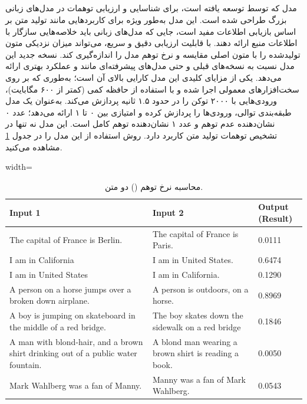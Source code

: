 \documentclass[11pt, a4paper, oneside]{book}
\begin{document}
			\subsection{}
				مدل  که توسط  توسعه یافته است، برای شناسایی و ارزیابی توهمات در مدل‌های زبانی بزرگ طراحی شده است. این مدل به‌طور ویژه برای کاربردهایی مانند تولید متن بر اساس بازیابی اطلاعات مفید است، جایی که مدل‌های زبانی باید خلاصه‌هایی سازگار با اطلاعات منبع ارائه دهند.  با قابلیت ارزیابی دقیق و سریع، می‌تواند میزان نزدیکی متون تولیدشده را با متون اصلی مقایسه و نرخ توهم مدل را اندازه‌گیری کند. نسخه جدید این مدل نسبت به نسخه‌های قبلی و حتی مدل‌های پیشرفته‌ای مانند  و  عملکرد بهتری ارائه می‌دهد. یکی از مزایای کلیدی این مدل کارایی بالای آن است؛ به‌طوری که بر روی سخت‌افزارهای معمولی اجرا شده و با استفاده از حافظه کمی (کمتر از ۶۰۰ مگابایت)، ورودی‌هایی با ۲۰۰۰ توکن را در حدود ۱.۵ ثانیه پردازش می‌کند.  به‌عنوان یک مدل طبقه‌بندی توالی، ورودی‌ها را پردازش کرده و امتیازی بین ۰ تا ۱ ارائه می‌دهد؛ عدد ۰ نشان‌دهنده عدم توهم و عدد ۱ نشان‌دهنده توهم کامل است. این مدل نه تنها در تشخیص توهمات تولید متن کاربرد دارد. روش استفاده از این مدل را در جدول \ref{Hallucination} مشاهده می‌کنید. \cite{hhem-2.1-open}
				\begin{table}[ht]
					\centering
					\caption{محاسبه نرخ توهم () دو متن.}
					\begin{latin}
						\begin{adjustbox}{width=\textwidth}
						\begin{tabular}{|p{5cm}|p{5cm}|p{2cm}|}
							\hline
							\textbf{Input 1} &
							\textbf{Input 2} &
							\textbf{Output (Result)} \\ \hline
							The capital of France is Berlin. &
							The capital of France is Paris. &
							0.0111 \\ \hline
							I am in California &
							I am in United States. &
							0.6474 \\ \hline
							I am in United States &
							I am in California. &
							0.1290 \\ \hline
							A person on a horse jumps over a broken down airplane. &
							A person is outdoors, on a horse. &
							0.8969 \\ \hline
							A boy is jumping on skateboard in the middle of a red bridge. &
							The boy skates down the sidewalk on a red bridge &
							0.1846 \\ \hline
							A man with blond-hair, and a brown shirt drinking out of a public water fountain. &
							A blond man wearing a brown shirt is reading a book. &
							0.0050 \\ \hline
							Mark Wahlberg was a fan of Manny. &
							Manny was a fan of Mark Wahlberg. &
							0.0543 \\ \hline
						\end{tabular}
						\end{adjustbox}
					\end{latin}
					\label{Hallucination}
				\end{table}
\end{document}
